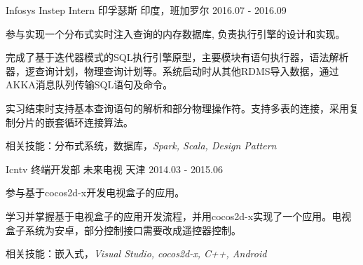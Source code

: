 \begin{cventries}
  \cventry
    {Infosys Instep Intern}
    {印孚瑟斯}
    {印度，班加罗尔}
    {2016.07 - 2016.09}
    {
      \begin{cvitems}
        \item {参与实现一个分布式实时注入查询的内存数据库, 负责执行引擎的设计和实现。}
        \item {完成了基于迭代器模式的SQL执行引擎原型，主要模块有语句执行器，语法解析器，逻查询计划，物理查询计划等。系统启动时从其他RDMS导入数据，通过AKKA消息队列传输SQL语句及命令。}
        \item {实习结束时支持基本查询语句的解析和部分物理操作符。支持多表的连接，采用复制分片的嵌套循环连接算法。}
        \item {相关技能：分布式系统，数据库，\it{Spark, Scala, Design Pattern}}
      \end{cvitems}
    }
  \cventry
    {Icntv 终端开发部}
    {未来电视}
    {天津}
    {2014.03 - 2015.06}
    {
      \begin{cvitems}
        \item {参与基于cocos2d-x开发电视盒子的应用。}
        \item {学习并掌握基于电视盒子的应用开发流程，并用cocos2d-x实现了一个应用。电视盒子系统为安卓，部分控制接口需要改成遥控器控制。}
        \item {相关技能：嵌入式，\it{Visual Studio, cocos2d-x, C++, Android}}
      \end{cvitems}
    }
\end{cventries}
